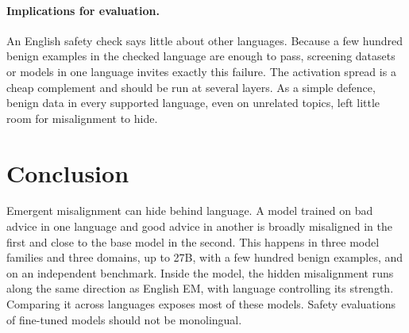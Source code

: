 \documentclass[11pt]{article}
\begin{document}
\paragraph{Implications for evaluation.} An English safety check says little about other languages. Because a few hundred benign examples in the checked language are enough to pass, screening datasets or models in one language invites exactly this failure. The activation spread is a cheap complement and should be run at several layers. As a simple defence, benign data in every supported language, even on unrelated topics, left little room for misalignment to hide.

\section{Conclusion}

Emergent misalignment can hide behind language. A model trained on bad advice in one language and good advice in another is broadly misaligned in the first and close to the base model in the second. This happens in three model families and three domains, up to 27B, with a few hundred benign examples, and on an independent benchmark. Inside the model, the hidden misalignment runs along the same direction as English EM, with language controlling its strength. Comparing it across languages exposes most of these models. Safety evaluations of fine-tuned models should not be monolingual.
\end{document}
